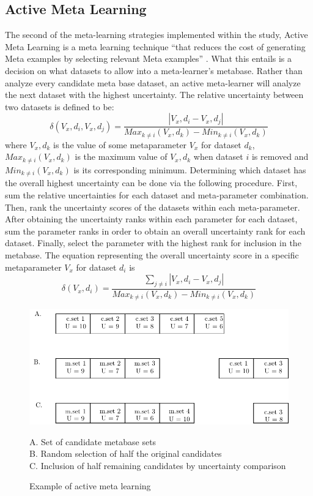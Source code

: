 \subsection{Active Meta Learning}
The second of the meta-learning strategies implemented within the study, Active
Meta Learning is a meta learning technique  ``that reduces the cost of
generating Meta examples by selecting relevant Meta examples'' \cite{Bhatt}.
What this entails is a decision on what datasets to allow into a meta-learner's
metabase. Rather than analyze every candidate meta base dataset, an active
meta-learner will analyze the next dataset with the highest uncertainty. The
relative uncertainty between two datasets is defined to be:
$$\delta(V_x,d_i,V_x,d_j) = \frac{|V_x,d_i - V_x,d_j|}{Max_{k\neq i}(V_x,d_k)- Min_{k\neq i}(V_x,d_k)}$$
where $V_x,d_k$ is the value of some metaparameter $V_x$ for dataset $d_k$,
$Max_{k\neq i}(V_x,d_k)$ is the maximum value of $V_x,d_k$ when dataset $i$ is
removed and $Min_{k\neq i}(V_x,d_k)$ is its corresponding minimum. Determining
which dataset has the overall highest uncertainty can be done via the following
procedure. First, sum the relative uncertainties for each dataset and
meta-parameter combination. Then, rank the uncertainty scores of the datasets within
each meta-parameter. After obtaining the uncertainty ranks within each parameter
for each dataset, sum the parameter ranks in order to obtain an overall
uncertainty rank for each dataset. Finally, select the parameter with the
highest rank for inclusion in the metabase. The equation representing the
overall uncertainty score in a specific metaparameter $V_x$ for dataset $d_i$ is
$$\delta(V_x,d_i) = \frac{\sum_{j\neq i} |V_x,d_i - V_x,d_j|}{Max_{k\neq i}(V_x,d_k)- Min_{k\neq i}(V_x,d_k)}$$
\begin{figure}[h]
\includegraphics{Chapters/Images/ActiveLearner/ActiveLearner.pdf}
\caption{Example of active meta learning}
\centering
\begin{flushleft}
A. Set of candidate metabase sets \\
B. Random selection of half the original candidates \\
C. Inclusion of half remaining candidates by uncertainty comparison \\
\end{flushleft}
\end{figure}
